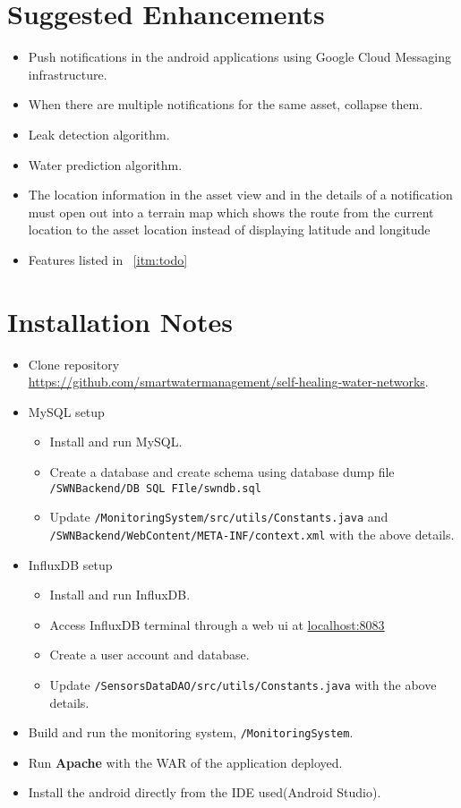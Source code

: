 \documentclass[11pt]{report} %
\begin{document}

\chapter{Suggested Enhancements}
\begin{itemize}
\item Push notifications in the android applications using Google Cloud Messaging infrastructure.
\item When there are multiple notifications for the same asset, collapse them.
\item Leak detection algorithm.
\item Water prediction algorithm.
\item The location information in the asset view and in the details of a notification must open out into a terrain map which shows the route from the current location to the asset location instead of displaying latitude and longitude
\item Features listed in ~\ref{itm:todo}
\end{itemize}


\chapter{Installation Notes}
\begin{itemize}
\item Clone repository \\ \url {https://github.com/smartwatermanagement/self-healing-water-networks}.
\item MySQL setup
\begin{itemize}
\item Install and run MySQL. 
\item Create a database and create schema using database dump file  \texttt{/SWNBackend/DB SQL FIle/swndb.sql}
\item Update \texttt{/MonitoringSystem/src/utils/Constants.java} and \\ \texttt{/SWNBackend/WebContent/META-INF/context.xml} with the above details.
\end{itemize}
\item InfluxDB setup
\begin{itemize}
\item Install and run InfluxDB.
\item Access InfluxDB terminal through a web ui at \url {localhost:8083}
\item Create a user account and database.
\item Update \texttt{/SensorsDataDAO/src/utils/Constants.java} with the above details.
\end{itemize}
\item Build and run the monitoring system, \texttt{/MonitoringSystem}.
\item Run \textbf{Apache} with the WAR of the application deployed.
\item Install the android directly from the IDE used(Android Studio).
\end{itemize}
\end{document}
